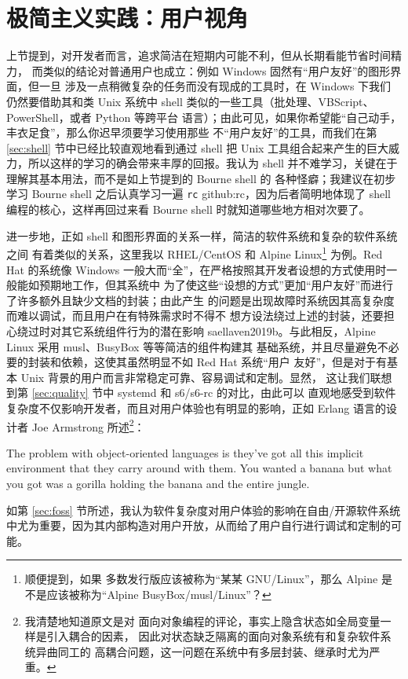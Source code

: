 \section{极简主义实践：用户视角}\label{sec:user}

上节提到，对开发者而言，追求简洁在短期内可能不利，但从长期看能节省时间精力，
而类似的结论对普通用户也成立：例如 Windows 固然有“用户友好”的图形界面，但一旦
涉及一点稍微复杂的任务而没有现成的工具时，在 Windows 下我们仍然要借助其和类 Unix
系统中 shell 类似的一些工具（批处理、VBScript、PowerShell，或者 Python 等跨平台
语言）；由此可见，如果你希望能“自己动手，丰衣足食”，那么你迟早须要学习使用那些
不“用户友好”的工具，而我们在第 \ref{sec:shell} 节中已经比较直观地看到通过 shell
把 Unix 工具组合起来产生的巨大威力，所以这样的学习的确会带来丰厚的回报。我认为
shell 并不难学习，关键在于理解其基本用法，而不是如上节提到的 Bourne shell 的
各种怪癖；我建议在初步学习 Bourne shell 之后认真学习一遍 \verb|rc|\cupercite%
{github:rc}，因为后者简明地体现了 shell 编程的核心，这样再回过来看
Bourne shell 时就知道哪些地方相对次要了。

进一步地，正如 shell 和图形界面的关系一样，简洁的软件系统和复杂的软件系统之间
有着类似的关系，这里我以 RHEL/CentOS 和 Alpine Linux\footnote{顺便提到，如果
多数发行版应该被称为“某某 GNU/Linux”，那么 Alpine
是不是应该被称为“Alpine BusyBox/musl/Linux”？} 为例。Red Hat 的系统像 Windows
一般大而“全”，在严格按照其开发者设想的方式使用时一般能如预期地工作，但其系统中
为了使这些“设想的方式”更加“用户友好”而进行了许多额外且缺少文档的封装；由此产生
的问题是出现故障时系统因其高复杂度而难以调试，而且用户在有特殊需求时不得不
想方设法绕过上述的封装，还要担心绕过时对其它系统组件行为的潜在影响\cupercite%
{saellaven2019b}。与此相反，Alpine Linux 采用 musl、BusyBox 等等简洁的组件构建其
基础系统，并且尽量避免不必要的封装和依赖，这使其虽然明显不如 Red Hat 系统“用户
友好”，但是对于有基本 Unix 背景的用户而言非常稳定可靠、容易调试和定制。显然，
这让我们联想到第 \ref{sec:quality} 节中 systemd 和 s6/s6-rc 的对比，由此可以
直观地感受到软件复杂度不仅影响开发者，而且对用户体验也有明显的影响，正如
Erlang 语言的设计者 Joe Armstrong 所述\footnote{我清楚地知道原文是对
面向对象编程的评论，事实上隐含状态如全局变量一样是引入耦合的因素，
因此对状态缺乏隔离的面向对象系统有和复杂软件系统异曲同工的
高耦合问题，这一问题在系统中有多层封装、继承时尤为严重。}：
\begin{quoting}
	The problem with object-oriented languages is they've got all this implicit
	environment that they carry around with them.  You wanted a banana but what
	you got was a gorilla holding the banana and the entire jungle.
\end{quoting}
如第 \ref{sec:foss} 节所述，我认为软件复杂度对用户体验的影响在自由/开源软件系统
中尤为重要，因为其内部构造对用户开放，从而给了用户自行进行调试和定制的可能。

